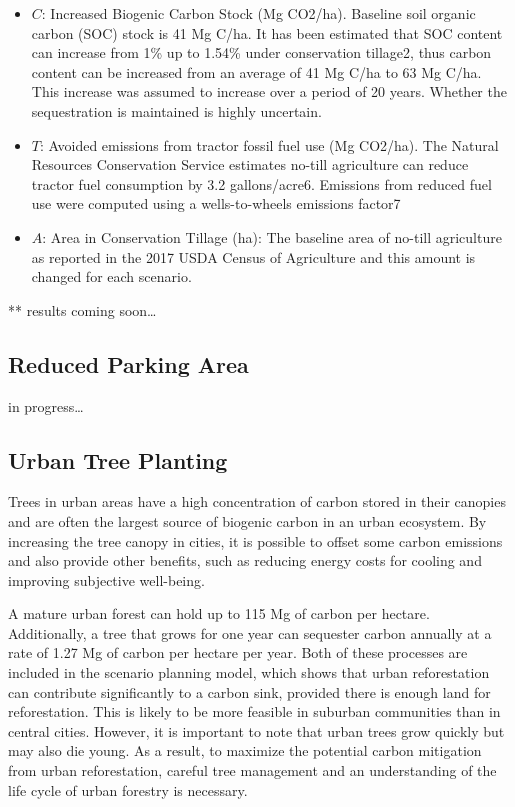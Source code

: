 \documentclass[
]{book}
\begin{document}
\begin{itemize}
\item
  \(C\): Increased Biogenic Carbon Stock (Mg CO2/ha). Baseline soil organic carbon (SOC) stock is 41 Mg C/ha. It has been estimated that SOC content can increase from 1\% up to 1.54\% under conservation tillage2, thus carbon content can be increased from an average of 41 Mg C/ha to 63 Mg C/ha. This increase was assumed to increase over a period of 20 years. Whether the sequestration is maintained is highly uncertain.
\item
  \(T\): Avoided emissions from tractor fossil fuel use (Mg CO2/ha). The Natural Resources Conservation Service estimates no-till agriculture can reduce tractor fuel consumption by 3.2 gallons/acre6. Emissions from reduced fuel use were computed using a wells-to-wheels emissions factor7
\item
  \(A\): Area in Conservation Tillage (ha): The baseline area of no-till agriculture as reported in the 2017 USDA Census of Agriculture and this amount is changed for each scenario.
\end{itemize}

** results coming soon\ldots{}

\hypertarget{reduced-parking-area}{%
\subsection{Reduced Parking Area}\label{reduced-parking-area}}

in progress\ldots{}

\hypertarget{urban-tree-planting}{%
\subsection{Urban Tree Planting}\label{urban-tree-planting}}

Trees in urban areas have a high concentration of carbon stored in their canopies and are often the largest source of biogenic carbon in an urban ecosystem. By increasing the tree canopy in cities, it is possible to offset some carbon emissions and also provide other benefits, such as reducing energy costs for cooling and improving subjective well-being.

A mature urban forest can hold up to 115 Mg of carbon per hectare. Additionally, a tree that grows for one year can sequester carbon annually at a rate of 1.27 Mg of carbon per hectare per year. Both of these processes are included in the scenario planning model, which shows that urban reforestation can contribute significantly to a carbon sink, provided there is enough land for reforestation. This is likely to be more feasible in suburban communities than in central cities. However, it is important to note that urban trees grow quickly but may also die young. As a result, to maximize the potential carbon mitigation from urban reforestation, careful tree management and an understanding of the life cycle of urban forestry is necessary.
\end{document}
